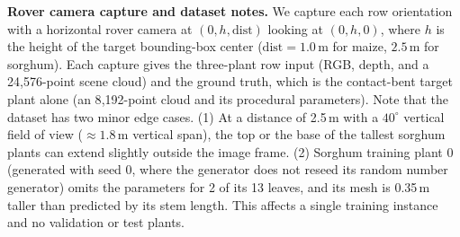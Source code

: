 \documentclass[10pt,twocolumn,letterpaper]{article}
\begin{document}
\begin{table}[h]
  \caption{\textbf{Crop row contact-solver convergence statistics.} ``Bent'' denotes the orientations where at least one target leaf bent, and ``Rolled'' denotes the orientations where at least one neighbor leaf rolled. No orientation failed, and the final exact triangle-triangle pass of the solver found no inter-plant crossings.}
  \label{tab:supp-rowstats}\label{tab:supp-row_stats}
  \centering\scriptsize
  \setlength{\tabcolsep}{2pt}
\end{table}

\noindent\textbf{Rover camera capture and dataset notes.}
We capture each row orientation with a horizontal rover camera at $(0, h, \mathrm{dist})$ looking at $(0, h, 0)$, where $h$ is the height of the target bounding-box center ($\mathrm{dist} = 1.0$\,m for maize, $2.5$\,m for sorghum). Each capture gives the three-plant row input (RGB, depth, and a 24{,}576-point scene cloud) and the ground truth, which is the contact-bent target plant alone (an 8{,}192-point cloud and its procedural parameters). Note that the dataset has two minor edge cases. (1) At a distance of 2.5\,m with a $40^\circ$ vertical field of view ($\approx 1.8$\,m vertical span), the top or the base of the tallest sorghum plants can extend slightly outside the image frame. (2) Sorghum training plant 0 (generated with seed 0, where the generator does not reseed its random number generator) omits the parameters for 2 of its 13 leaves, and its mesh is 0.35\,m taller than predicted by its stem length. This affects a single training instance and no validation or test plants.
\end{document}
